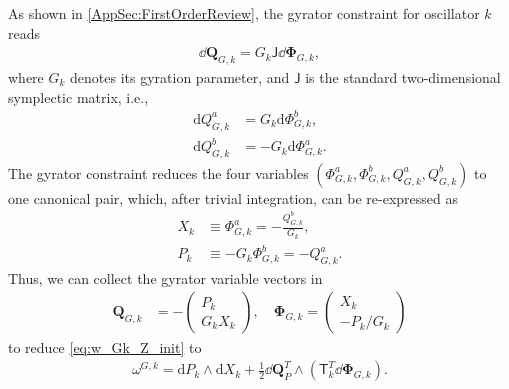\documentclass[prx,aps,twocolumn,article]{revtex4-2}
\newcommand{\msf}[1]{\mathsf{#1}}
\newcommand{\bsb}[1]{\boldsymbol{#1}}
\newcommand{\bPhi}{\bsb{\Phi}}
\newcommand{\bQ}{\bsb{Q}}
\newcommand{\dbQ}{\dd\bQ}
\newcommand{\dbPhi}{\dd\bPhi}
\newcommand{\msT}{\msf{T}}
\newcommand{\msJ}{\msf{J}}
\begin{document}
As shown in \cref{AppSec:FirstOrderReview}, the gyrator constraint for oscillator $k$ reads
\begin{align}
    \dbQ_{G,k}
    =
    G_k
    \msf{J}
    \dbPhi_{G,k},
    \label{Eq:GyratorConstraint}
\end{align}
where $G_k$ denotes its gyration parameter, and $\msJ$ is the standard
two-dimensional symplectic matrix, i.e., 
\begin{align}
    \mathrm{d}Q_{G,k}^{a}
    &=
    G_k
    \mathrm{d}\Phi_{G,k}^{b},
    \nonumber\\
    \mathrm{d}Q_{G,k}^{b}
    &=
    -G_k
    \mathrm{d}\Phi_{G,k}^{a}.
\end{align}
The gyrator constraint reduces the four variables
$(\Phi_{G,k}^{a},\Phi_{G,k}^{b},
Q_{G,k}^{a},Q_{G,k}^{b})$
to one canonical pair, which, after trivial integration, can be re-expressed as
\begin{align}
    X_k
    &\equiv
    \Phi_{G,k}^{a}
    =
    -\frac{Q_{G,k}^{b}}{G_k},
    \nonumber\\
    P_k
    &\equiv
    -G_k\Phi_{G,k}^{b}
    =
    -Q_{G,k}^{a}.
    \label{Eq:GyratorCanonicalVariables}
\end{align}
Thus, we can collect the gyrator variable vectors in
\begin{align}
    \bQ_{G,k}
    &=
    -
    \begin{pmatrix}
        P_k\\
        G_kX_k
    \end{pmatrix},
    \quad
    \bPhi_{G,k}
    =
    \begin{pmatrix}
        X_k\\
        -P_k/G_k
    \end{pmatrix}
    \label{Eq:GyratorChargeCanonicalVariables}
\end{align}
to reduce \cref{eq:w_Gk_Z_init} to
\begin{align}
    \omega^{G,k}
    =
    \mathrm{d}P_k
    \wedge
    \mathrm{d}X_k
    +
    \frac{1}{2}
    \dbQ_P^T
    \wedge
    \left(
        \msT_k^T
        \dbPhi_{G,k}
    \right).
\end{align}
\end{document}
